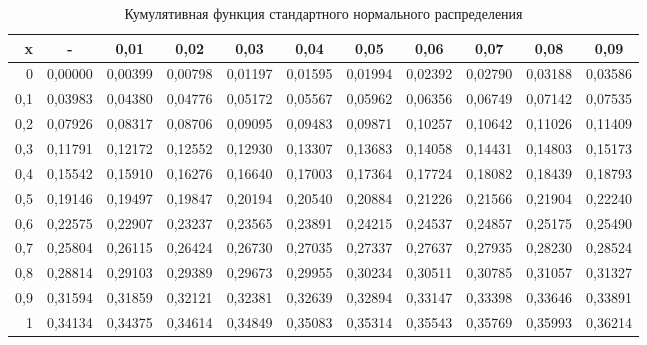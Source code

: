 \documentclass[12pt,a4paper]{article}
\begin{document}
\begin{table}[H]
  \fontsize{8pt}{8pt}\selectfont
  \centering
  \captionsetup{justification=centering}
  \caption{Кумулятивная функция стандартного нормального распределения}
    \begin{tabular}{rrrrrrrrrrr}
    \toprule
    x     & \multicolumn{1}{c}{           -     } & \multicolumn{1}{c}{       0,01   } & \multicolumn{1}{c}{       0,02   } & \multicolumn{1}{c}{       0,03   } & \multicolumn{1}{c}{       0,04   } & \multicolumn{1}{c}{       0,05   } & \multicolumn{1}{c}{       0,06   } & \multicolumn{1}{c}{       0,07   } & \multicolumn{1}{c}{       0,08   } & \multicolumn{1}{c}{       0,09   } \\
    \midrule
0     & 0,00000 & 0,00399 & 0,00798 & 0,01197 & 0,01595 & 0,01994 & 0,02392 & 0,02790 & 0,03188 & 0,03586 \\
    0,1   & 0,03983 & 0,04380 & 0,04776 & 0,05172 & 0,05567 & 0,05962 & 0,06356 & 0,06749 & 0,07142 & 0,07535 \\
    0,2   & 0,07926 & 0,08317 & 0,08706 & 0,09095 & 0,09483 & 0,09871 & 0,10257 & 0,10642 & 0,11026 & 0,11409 \\
    0,3   & 0,11791 & 0,12172 & 0,12552 & 0,12930 & 0,13307 & 0,13683 & 0,14058 & 0,14431 & 0,14803 & 0,15173 \\
    0,4   & 0,15542 & 0,15910 & 0,16276 & 0,16640 & 0,17003 & 0,17364 & 0,17724 & 0,18082 & 0,18439 & 0,18793 \\
    0,5   & 0,19146 & 0,19497 & 0,19847 & 0,20194 & 0,20540 & 0,20884 & 0,21226 & 0,21566 & 0,21904 & 0,22240 \\
    0,6   & 0,22575 & 0,22907 & 0,23237 & 0,23565 & 0,23891 & 0,24215 & 0,24537 & 0,24857 & 0,25175 & 0,25490 \\
    0,7   & 0,25804 & 0,26115 & 0,26424 & 0,26730 & 0,27035 & 0,27337 & 0,27637 & 0,27935 & 0,28230 & 0,28524 \\
    0,8   & 0,28814 & 0,29103 & 0,29389 & 0,29673 & 0,29955 & 0,30234 & 0,30511 & 0,30785 & 0,31057 & 0,31327 \\
    0,9   & 0,31594 & 0,31859 & 0,32121 & 0,32381 & 0,32639 & 0,32894 & 0,33147 & 0,33398 & 0,33646 & 0,33891 \\
    1     & 0,34134 & 0,34375 & 0,34614 & 0,34849 & 0,35083 & 0,35314 & 0,35543 & 0,35769 & 0,35993 & 0,36214 \\

\end{tabular}
\end{table}
\end{document}

